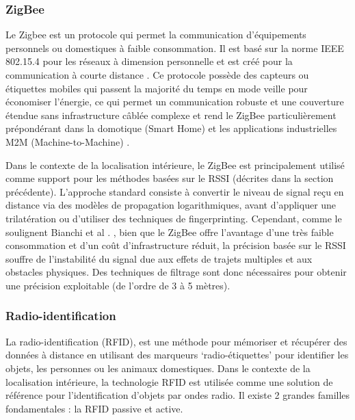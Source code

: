 \documentclass[11pt, a4paper]{article}
\begin{document}
\subsubsection{ZigBee}

Le Zigbee est un protocole qui permet la communication d'équipements personnels ou domestiques à faible consommation. Il est basé sur la norme IEEE 802.15.4 pour les réseaux à dimension personnelle et est créé pour la communication à courte distance \cite{obeidatReviewIndoorLocalization2021}. Ce protocole possède des capteurs ou étiquettes mobiles qui passent la majorité du temps en mode veille pour économiser l’énergie, ce qui permet un communication robuste et une couverture étendue sans infrastructure câblée complexe et rend le ZigBee particulièrement prépondérant dans la domotique (Smart Home) et les applications industrielles M2M (Machine-to-Machine) \cite{bianchiRSSIBasedIndoorLocalization2019}.

Dans le contexte de la localisation intérieure, le ZigBee est principalement utilisé comme support pour les méthodes basées sur le RSSI (décrites dans la section précédente). L’approche standard consiste à convertir le niveau de signal reçu en distance via des modèles de propagation logarithmiques, avant d’appliquer une trilatération ou d’utiliser des techniques de fingerprinting. Cependant, comme le soulignent Bianchi et al \cite{bianchiRSSIBasedIndoorLocalization2019}. , bien que le ZigBee offre l’avantage d’une très faible consommation et d’un coût d’infrastructure réduit\cite{sadowskiRSSIBasedIndoorLocalization2018}, la précision basée sur le RSSI souffre de l’instabilité du signal due aux effets de trajets multiples et aux obstacles physiques. Des techniques de filtrage sont donc nécessaires pour obtenir une précision exploitable (de l’ordre de 3 à 5 mètres).

\subsubsection{Radio-identification}

La radio-identification (RFID), est une méthode pour mémoriser et récupérer des données à distance en utilisant des marqueurs ‘radio-étiquettes’ pour identifier les objets, les personnes ou les animaux domestiques. Dans le contexte de la localisation intérieure, la technologie RFID est utilisée comme une solution de référence pour l'identification d'objets par ondes radio. Il existe 2 grandes familles fondamentales : la RFID passive et active.
\end{document}
